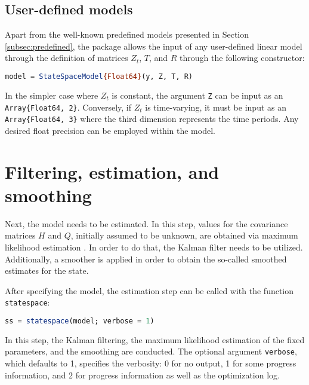 \documentclass{juliacon}
\begin{document}
\subsection{User-defined models}

Apart from the well-known predefined models presented in Section \ref{subsec:predefined}, the package allows the input of any user-defined linear model through the definition of matrices $Z_{t}$, $T$, and $R$ through the following constructor:
%
\begin{lstlisting}[language = Julia]
model = StateSpaceModel{Float64}(y, Z, T, R)
\end{lstlisting}

In the simpler case where $Z_{t}$ is constant, the argument \texttt{Z} can be input as an \texttt{Array\{Float64, 2\}}. Conversely, if $Z_{t}$ is time-varying, it must be input as an \texttt{Array\{Float64, 3\}} where the third dimension represents the time periods. Any desired float precision can be employed within the model.

\section{Filtering, estimation, and smoothing} \label{sec:estimation}

Next, the model needs to be estimated. In this step, values for the covariance matrices $H$ and $Q$, initially assumed to be unknown, are obtained via maximum likelihood estimation \cite{casella2002statistical}. In order to do that, the Kalman filter needs to be utilized. Additionally, a smoother is applied in order to obtain the so-called smoothed estimates for the state.

After specifying the model, the estimation step can be called with the function \texttt{statespace}:
%
\begin{lstlisting}[language = Julia]
ss = statespace(model; verbose = 1)
\end{lstlisting}

In this step, the Kalman filtering, the maximum likelihood estimation of the fixed parameters, and the smoothing are conducted. The optional argument \texttt{verbose}, which defaults to 1, specifies the verbosity: 0 for no output, 1 for some progress information, and 2 for progress information as well as the optimization log.
\end{document}
